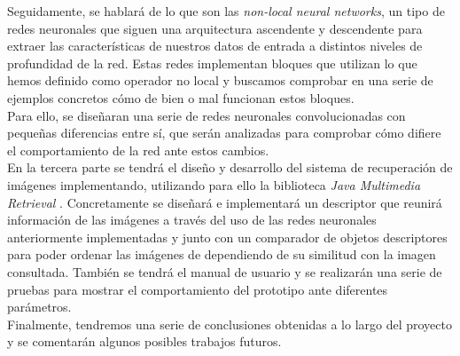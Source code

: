 Seguidamente, se hablará de lo que son las \emph{non-local neural networks}, un tipo de redes neuronales que siguen una arquitectura ascendente y descendente para extraer las características de nuestros datos de entrada a distintos niveles de profundidad de la red. Estas redes implementan bloques que utilizan lo que hemos definido como operador no local y buscamos comprobar en una serie de ejemplos concretos cómo de bien o mal funcionan estos bloques.\\

Para ello, se diseñaran una serie de redes neuronales convolucionadas con pequeñas diferencias entre sí, que serán analizadas para comprobar cómo difiere el comportamiento de la red ante estos cambios.\\


En la tercera parte se tendrá el diseño y desarrollo del sistema de recuperación de imágenes implementando, utilizando para ello la biblioteca \emph{Java Multimedia Retrieval} \cite{JMR}. Concretamente se diseñará e implementará un descriptor que reunirá información de las imágenes a través del uso de las redes neuronales anteriormente implementadas y junto con un comparador de objetos descriptores para poder ordenar las imágenes de dependiendo de su similitud con la imagen consultada. También se tendrá el manual de usuario y se realizarán una serie de pruebas para mostrar el comportamiento del prototipo ante diferentes parámetros.\\

Finalmente, tendremos una serie de conclusiones obtenidas a lo largo del proyecto y se comentarán algunos posibles trabajos futuros.
\endinput
